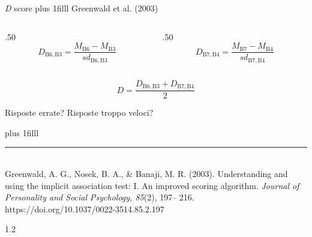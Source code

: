 \documentclass[compress]{beamer}
\newcommand\Factor{1.2}
\begin{document}
\begin{frame}{\emph{D} score}
	\vskip0pt plus 1filll
	Greenwald et al. (2003)
	
	\vspace{5mm}
	\begin{columns}
		\begin{column}{.50\linewidth}
			$$D_{\mathrm{B6,B3}} = \frac{M_{\mathrm{B6}} - M_{\mathrm{B3}}}{sd_{\mathrm{B6, B3}}}$$
		\end{column}
		\begin{column}{.50\linewidth}
			$$D_{\mathrm{B7,B4}} = \frac{M_{\mathrm{B7}} - M_{\mathrm{B4}}}{sd_{\mathrm{B7, B4}}}$$
		\end{column}
	\end{columns}
	
	\vspace{5mm}
	\begin{equation*}
		D = \frac{D_{\mathrm{B6,B3}} + D_{\mathrm{B7,B4}}}{2}
	\end{equation*}
	
	\pause
	\vspace{5mm}
	Risposte errate? Risposte troppo veloci?
	
	\vskip0pt plus 1filll
	
	\color{template}\rule{0.30\linewidth}{0.5pt}\\
	\color{black}
	\scriptsize{Greenwald, A. G., Nosek, B. A., \& Banaji, M. R.
		(2003). Understanding and using the implicit association test: I. An improved scoring algorithm. \emph{Journal
			of Personality and Social Psychology, 85}(2), 197–
		216. https://doi.org/10.1037/0022-3514.85.2.197}
\end{frame}

\begin{frame}
	
	\begin{spacing}\Factor
		\begin{table}[th!]
			\centering
			\caption{\label{tab:overview} Panoramica degli algoritmi di scoring}

		\end{table}
	\end{spacing}
\end{frame}
\end{document}
